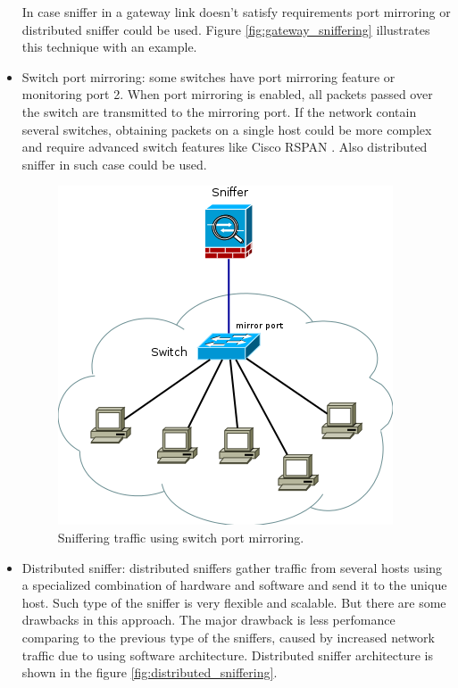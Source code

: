 \documentclass[thesis=M,english]{FITthesis}[2011/07/15]
\begin{document}
\begin{itemize}
In case sniffer in a gateway link doesn't satisfy requirements port mirroring or distributed sniffer could be used. Figure \ref{fig:gateway_sniffering} illustrates this technique with an example.
\item Switch port mirroring: some switches have port mirroring feature or monitoring port 2. When port mirroring is enabled, all packets passed over the switch are transmitted to the mirroring port. If the network contain several switches, obtaining packets on a single host could be more complex and require advanced switch features like Cisco RSPAN \cite{cisco_site}. Also distributed sniffer in such case could be used.

\begin{figure}[h]
\centering
\includegraphics[scale=0.6]{images/mirror_sniffering.png}
\caption{Sniffering traffic using switch port mirroring.}
\label{fig:mirror_sniffering}
\end{figure}

\item Distributed sniffer: distributed sniffers gather traffic from several hosts using a specialized combination of hardware and software and send it to the unique host. Such type of the sniffer is very flexible and scalable. But there are some drawbacks in this approach. The major drawback is less perfomance comparing to the previous type of the sniffers, caused by increased network traffic due to using software architecture. Distributed sniffer architecture is shown in the figure \ref{fig:distributed_sniffering}.


\end{itemize}
\end{document}
